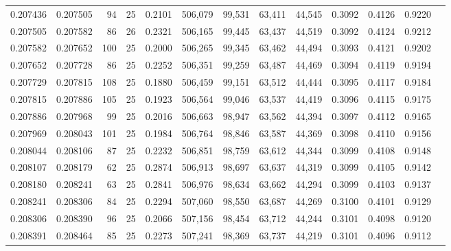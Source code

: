 \begin{tabular}{rrrrrrrrrrrrr}
0.207436 & 0.207505 &    94 &  25 &                                     0.2101 & 506,079 &  99,531 &  63,411 &  44,545 & 0.3092 & 0.4126 & 0.9220 \\
0.207505 & 0.207582 &    86 &  26 &                                     0.2321 & 506,165 &  99,445 &  63,437 &  44,519 & 0.3092 & 0.4124 & 0.9212 \\
0.207582 & 0.207652 &   100 &  25 &                                     0.2000 & 506,265 &  99,345 &  63,462 &  44,494 & 0.3093 & 0.4121 & 0.9202 \\
0.207652 & 0.207728 &    86 &  25 &                                     0.2252 & 506,351 &  99,259 &  63,487 &  44,469 & 0.3094 & 0.4119 & 0.9194 \\
0.207729 & 0.207815 &   108 &  25 &                                     0.1880 & 506,459 &  99,151 &  63,512 &  44,444 & 0.3095 & 0.4117 & 0.9184 \\
0.207815 & 0.207886 &   105 &  25 &                                     0.1923 & 506,564 &  99,046 &  63,537 &  44,419 & 0.3096 & 0.4115 & 0.9175 \\
0.207886 & 0.207968 &    99 &  25 &                                     0.2016 & 506,663 &  98,947 &  63,562 &  44,394 & 0.3097 & 0.4112 & 0.9165 \\
0.207969 & 0.208043 &   101 &  25 &                                     0.1984 & 506,764 &  98,846 &  63,587 &  44,369 & 0.3098 & 0.4110 & 0.9156 \\
0.208044 & 0.208106 &    87 &  25 &                                     0.2232 & 506,851 &  98,759 &  63,612 &  44,344 & 0.3099 & 0.4108 & 0.9148 \\
0.208107 & 0.208179 &    62 &  25 &                                     0.2874 & 506,913 &  98,697 &  63,637 &  44,319 & 0.3099 & 0.4105 & 0.9142 \\
0.208180 & 0.208241 &    63 &  25 &                                     0.2841 & 506,976 &  98,634 &  63,662 &  44,294 & 0.3099 & 0.4103 & 0.9137 \\
0.208241 & 0.208306 &    84 &  25 &                                     0.2294 & 507,060 &  98,550 &  63,687 &  44,269 & 0.3100 & 0.4101 & 0.9129 \\
0.208306 & 0.208390 &    96 &  25 &                                     0.2066 & 507,156 &  98,454 &  63,712 &  44,244 & 0.3101 & 0.4098 & 0.9120 \\
0.208391 & 0.208464 &    85 &  25 &                                     0.2273 & 507,241 &  98,369 &  63,737 &  44,219 & 0.3101 & 0.4096 & 0.9112 \\

\end{tabular}
